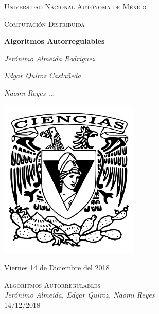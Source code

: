 \documentclass[12pt,a4paper]{article}
\begin{document}
\begin{titlepage}
	\centering
	{\scshape\LARGE Universidad Nacional Autónoma de México \par}
	\vspace{1cm}
	{\scshape\Large Computación Distribuida\par}
	\vspace{1cm}
	{\huge\bfseries Algoritmos Autorregulables\par}
	\vspace{1cm}
    {\Large\itshape Jerónimo Almeida Rodríguez \par}
    \vspace{.5cm}
	{\Large\itshape Edgar Quiroz Castañeda \par}
    \vspace{.5cm}
	{\Large\itshape Naomi Reyes ...\par}
	\vfill
	\includegraphics[width=0.5\textwidth]{escudo_f-ciencias.png}
	\vfill

	{\large Viernes 14 de Diciembre del 2018 \par}
\end{titlepage}

	\pagebreak
	\setlength{\voffset}{-0.75in}
	\setlength{\headsep}{5pt}


\begin{center}
		\textsc{\huge Algoritmos Autorregulables\\}
		\textit{Jerónimo Almeida, Edgar Quiroz, Naomi Reyes\\}
        14/12/2018
\end{center}
\end{document}
